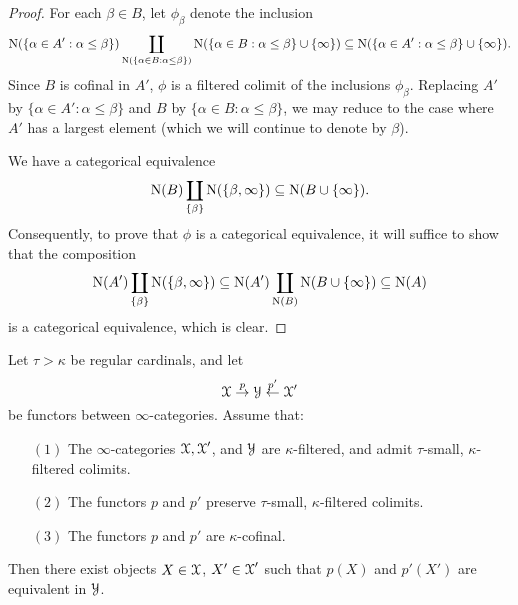 \begin{proof}
For each $\beta \in B$, let $\phi_{\beta}$ denote the inclusion
$$ \operatorname{N}(\{ \alpha \in A': \alpha \leq \beta\}) \coprod_{ \operatorname{N}(\{ \alpha \in B: \alpha \leq \beta \}) }
\operatorname{N}(\{ \alpha \in B: \alpha \leq \beta \} \cup \{ \infty \} ) \subseteq 
\operatorname{N} (\{ \alpha \in A': \alpha \leq \beta \} \cup \{\infty\} ).$$
Since $B$ is cofinal in $A'$, $\phi$ is a filtered colimit of the inclusions 
$\phi_{\beta}$. Replacing $A'$ by $\{ \alpha \in A' : \alpha \leq \beta \}$ and
$B$ by $\{ \alpha \in B: \alpha \leq \beta \}$, we may reduce to the case where
$A'$ has a largest element (which we will continue to denote by $\beta$).

We have a categorical equivalence
$$ \operatorname{N}(B) \coprod_{ \{ \beta \} } \operatorname{N}(\{ \beta, \infty \}) \subseteq \operatorname{N} (B \cup \{\infty\} ).$$
Consequently, to prove that $\phi$ is a categorical equivalence, it will suffice to show that the composition
$$ \operatorname{N}(A') \coprod_{ \{\beta \} } \operatorname{N}(\{ \beta, \infty\}) 
\subseteq \operatorname{N}(A') \coprod_{ \operatorname{N}(B) } \operatorname{N} ( B \cup \{ \infty\} ) \subseteq \operatorname{N}(A)$$
is a categorical equivalence, which is clear. 
\end{proof}

\begin{lemma}\label{remuswolf}
Let $\tau > \kappa$ be regular cardinals, and let
$$ \operatorname{\mathcal{X}} \stackrel{p}{\rightarrow} \operatorname{\mathcal{Y}} \stackrel{p'}{\leftarrow} \operatorname{\mathcal{X}}'$$
be functors between $\infty$-categories.
Assume that:
\begin{itemize}
\item[$(1)$] The $\infty$-categories $\operatorname{\mathcal{X}}, \operatorname{\mathcal{X}}'$, and $\operatorname{\mathcal{Y}}$ are $\kappa$-filtered, and
admit $\tau$-small, $\kappa$-filtered colimits.
\item[$(2)$] The functors $p$ and $p'$ preserve $\tau$-small, $\kappa$-filtered colimits.
\item[$(3)$] The functors $p$ and $p'$ are $\kappa$-cofinal.
\end{itemize}
Then there exist objects $X \in \operatorname{\mathcal{X}}$, $X' \in \operatorname{\mathcal{X}}'$ such that $p(X)$ and $p'(X')$ are equivalent in $\operatorname{\mathcal{Y}}$.
\end{lemma}

